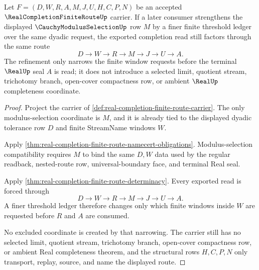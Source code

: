 \begin{theorem}
\label{thm:real-completion-finite-route-modulus-refinement}
Let $F=(D,W,R,A,M,J,U,H,C,P,N)$ be an accepted $\RealCompletionFiniteRouteUp$ carrier. If a later consumer strengthens the displayed $\CauchyModulusSelectionUp$ row $M$ by a finer finite threshold ledger over the same dyadic request, the exported completion read still factors through the same route
$$
D \longrightarrow W \longrightarrow R \longrightarrow M \longrightarrow J \longrightarrow U \longrightarrow A .
$$
The refinement only narrows the finite window requests before the terminal $\RealUp$ seal $A$ is read; it does not introduce a selected limit, quotient stream, trichotomy branch, open-cover compactness row, or ambient $\RealUp$ completeness coordinate.
\end{theorem}
\begin{proof}
Project the carrier of \autoref{def:real-completion-finite-route-carrier}. The only modulus-selection coordinate is $M$, and it is already tied to the displayed dyadic tolerance row $D$ and finite StreamName windows $W$.

Apply \autoref{thm:real-completion-finite-route-namecert-obligations}. Modulus-selection compatibility requires $M$ to bind the same $D,W$ data used by the regular readback, nested-route row, universal-boundary face, and terminal Real seal.

Apply \autoref{thm:real-completion-finite-route-determinacy}. Every exported read is forced through
$$
D \longrightarrow W \longrightarrow R \longrightarrow M \longrightarrow J \longrightarrow U \longrightarrow A .
$$
A finer threshold ledger therefore changes only which finite windows inside $W$ are requested before $R$ and $A$ are consumed.

No excluded coordinate is created by that narrowing. The carrier still has no selected limit, quotient stream, trichotomy branch, open-cover compactness row, or ambient Real completeness theorem, and the structural rows $H,C,P,N$ only transport, replay, source, and name the displayed route.
\end{proof}



